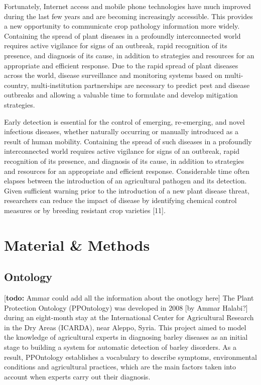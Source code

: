 \documentclass{frontiersSCNS} %
\newcommand{\todo}[1]{
  \rule{0pt}{0pt}\marginpar{{\color{blue}\rule{1ex}{1ex}}}
  {[\textbf{\color{blue}todo:} #1]}}
\begin{document}
Fortunately, Internet access and mobile phone technologies have much improved during the last few years and are becoming increasingly accessible. This provides a new opportunity to communicate crop pathology information more widely. Containing the spread of plant diseases in a profoundly interconnected world requires active vigilance for signs of an outbreak, rapid recognition of its presence, and diagnosis of its cause, in addition to strategies and resources for an appropriate and efficient response. Due to the rapid spread of plant diseases across the world, disease surveillance and monitoring systems based on multi-country, multi-institution partnerships are necessary to predict pest and disease outbreaks and allowing a valuable time to formulate and develop mitigation strategies. 

Early detection is essential for the control of emerging, re-emerging, and novel infectious diseases, whether naturally occurring or manually introduced as a result of human mobility. Containing the spread of such diseases in a profoundly interconnected world requires active vigilance for signs of an outbreak, rapid recognition of its presence, and diagnosis of its cause, in addition to strategies and resources for an appropriate and efficient response. Considerable time often elapses between the introduction of an agricultural pathogen and its detection. Given sufficient warning prior to the introduction of a new plant disease threat, researchers can reduce the impact of disease by identifying chemical control measures or by breeding resistant crop varieties [11].  

\section{Material \& Methods}

\subsection{Ontology}
\todo{Ammar could add all the information about the onotlogy here}
The Plant Protection Ontology (PPOntology) was developed in 2008 [by Ammar Halabi?] during an eight-month stay at the International Center for Agricultural Research in the Dry Areas (ICARDA), near Aleppo, Syria. This project aimed to model the knowledge of agricultural experts in diagnosing barley diseases as an initial stage to building a system for automatic detection of barley disorders. As a result, PPOntology establishes a vocabulary to describe symptoms, environmental conditions and agricultural practices, which are the main factors taken into account when experts carry out their diagnosis.
\end{document}
